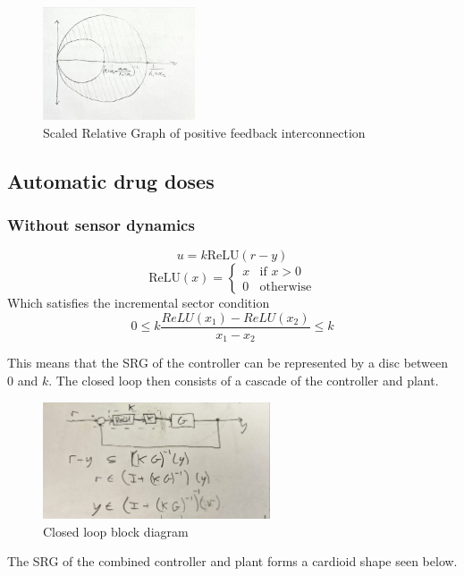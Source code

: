 \documentclass{article}
\begin{document}
\begin{figure}[H]
    \centering
    \includegraphics[width=0.4\textwidth]{figures/feedback_SRG.jpg}
    \caption{Scaled Relative Graph of positive feedback interconnection}
\end{figure}

\subsection{Automatic drug doses}

\subsubsection{Without sensor dynamics}

\begin{equation}
    u = k \text{ReLU}(r - y)
\end{equation}
\begin{equation}
    \text{ReLU}(x) = \begin{cases}
        x & \text{if } x > 0 \\
        0 & \text{otherwise}
    \end{cases}
\end{equation}
Which satisfies the incremental sector condition
\begin{equation}
    0 \leq k \frac{ReLU(x_1) - ReLU(x_2)}{x_1 - x_2} \leq k
\end{equation}

This means that the SRG of the controller can be represented by a disc between 0 and $k$.
The closed loop then consists of a cascade of the controller and plant.

\begin{figure}[H]
    \centering
    \includegraphics[width=0.6\textwidth]{figures/closed_loop.jpg}
    \caption{Closed loop block diagram}
\end{figure}
The SRG of the combined controller and plant forms a cardioid shape seen below.
\end{document}

